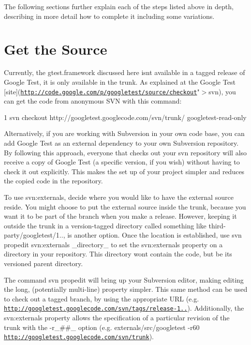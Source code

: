 The following sections further explain each of the steps listed above in depth, describing in more detail how to complete it including some variations.

\section*{Get the Source}

Currently, the gtest.\+framework discussed here isn\textquotesingle{}t available in a tagged release of Google Test, it is only available in the trunk. As explained at the Google Test \mbox{[}site\mbox{]}(\href{http://code.google.com/p/googletest/source/checkout}{\tt http\+://code.\+google.\+com/p/googletest/source/checkout}"$>$svn), you can get the code from anonymous S\+VN with this command\+:


\begin{DoxyCode}
1 svn checkout http://googletest.googlecode.com/svn/trunk/ googletest-read-only
\end{DoxyCode}


Alternatively, if you are working with Subversion in your own code base, you can add Google Test as an external dependency to your own Subversion repository. By following this approach, everyone that checks out your svn repository will also receive a copy of Google Test (a specific version, if you wish) without having to check it out explicitly. This makes the set up of your project simpler and reduces the copied code in the repository.

To use {\ttfamily svn\+:externals}, decide where you would like to have the external source reside. You might choose to put the external source inside the trunk, because you want it to be part of the branch when you make a release. However, keeping it outside the trunk in a version-\/tagged directory called something like {\ttfamily third-\/party/googletest/1..}, is another option. Once the location is established, use {\ttfamily svn propedit svn\+:externals \+\_\+directory\+\_\+} to set the svn\+:externals property on a directory in your repository. This directory won\textquotesingle{}t contain the code, but be its versioned parent directory.

The command {\ttfamily svn propedit} will bring up your Subversion editor, making editing the long, (potentially multi-\/line) property simpler. This same method can be used to check out a tagged branch, by using the appropriate U\+RL (e.\+g. {\ttfamily \href{http://googletest.googlecode.com/svn/tags/release-1.0.1}{\tt http\+://googletest.\+googlecode.\+com/svn/tags/release-\/1..}}). Additionally, the svn\+:externals property allows the specification of a particular revision of the trunk with the {\ttfamily -\/r\+\_\+\#\#\+\_\+} option (e.\+g. {\ttfamily externals/src/googletest -\/r60 \href{http://googletest.googlecode.com/svn/trunk}{\tt http\+://googletest.\+googlecode.\+com/svn/trunk}}).

